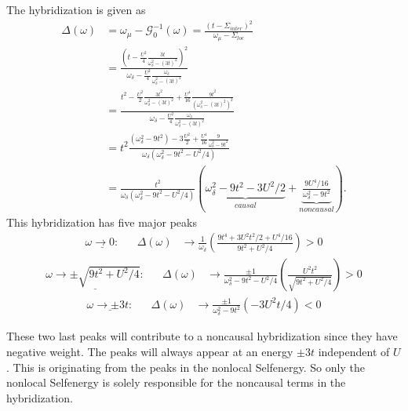 \documentclass[12pt,a4paper]{scrartcl}
\numberwithin{equation}{section}
\begin{document}
The hybridization is given as
\begin{align}
 \Delta(\omega) &= \omega_{\mu} - \mathcal{G}^{-1}_0(\omega)  
 = \frac{ (t-\Sigma_{inter})^2 }{\omega_{\mu}-\Sigma_{loc}} \nonumber\\
 &= \frac{ \left( t - \frac{U^2}{4} \frac{ 3t }{ \omega^2_{\delta} -(3t)^2} \right)^2 }
           {\omega_{\delta}- \frac{U^2}{4} \frac{\omega_{\delta} }{ \omega^2_{\delta} -(3t)^2} } \nonumber\\
&= \frac{ t^2 -\frac{U^2}{2} \frac{ 3t^2 }{ \omega^2_{\delta} -(3t)^2}  + \frac{U^4}{16} \frac{ 9t^2 }{ ( \omega^2_{\delta} -(3t)^2 )^2 }  }
           {\omega_{\delta}- \frac{U^2}{4} \frac{  \omega_{\delta} }{  \omega^2_{\delta} -(3t)^2  }  } \nonumber\\
%
&= t^2 \frac{ (\omega^2_{\delta} -9t^2) - 3 \frac{U^2}{2}    + \frac{U^4}{16} \frac{ 9 }{ \omega^2_{\delta} -9t^2  }  }
           {\omega_{\delta} \left( \omega^2_{\delta} -9t^2 - U^2/4  \right)  } \nonumber\\
%
&= \frac{ t^2 }{\omega_{\delta} \left( \omega^2_{\delta} -9t^2 - U^2/4  \right)  }
\left( 
\underbrace{  \omega^2_{\delta} -9t^2  -3U^2/2  }_{causal}
 +\underbrace{ \frac{ 9 U^4 /16 }{ \omega^2_{\delta} -9t^2   }  }_{noncausal}  \right)
 \label{eq:noncausal_exact_hybridization}.
\end{align}
This hybridization has five major peaks
\begin{align}
 \underline{\omega \rightarrow 0:} &&  
  \Delta(\omega) &\rightarrow \frac{1}{\omega_{\delta}}
                 \left( 
                 \frac{ 9t^4 + 3U^2t^2/2 + U^4/16}{9t^2 + U^2/4}
                 \right) > 0
\end{align}
\begin{align}
 \underline{\omega \rightarrow \pm \sqrt{9t^2 + U^2/4}:} &&  
  \Delta(\omega) &\rightarrow \frac{\pm1}{ \omega^2_{\delta} -9t^2 - U^2/4}
                \left( \frac{ U^2 t^2}{\sqrt{9t^2 + U^2/4} } \right) > 0
\end{align}
\begin{align}
 \underline{\omega \rightarrow \pm 3t:} &&  
  \Delta(\omega) 
  &\rightarrow 
    \frac{ \pm1 }{ \omega^2_{\delta} -9t^2   } \left( - 3 U^2 t /4  \right)  < 0
\end{align}

These two last peaks will contribute to a noncausal hybridization since they
have negative weight. The peaks will always appear 
at an energy $\pm 3t$ independent of $U$. This is originating from the peaks in the nonlocal Selfenergy.
So only the nonlocal Selfenergy is solely responsible for the noncausal terms in the hybridization.
\end{document}
